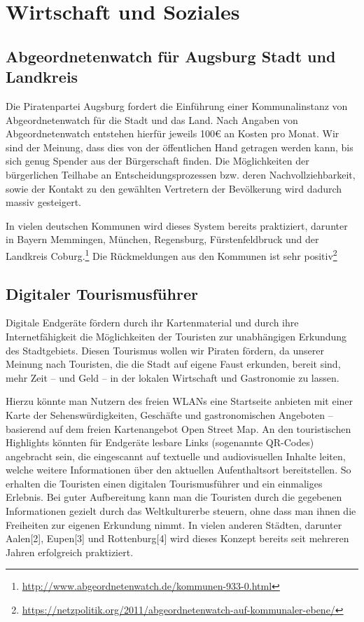 \chapter{Wirtschaft und Soziales}

  \section{Abgeordnetenwatch für Augsburg Stadt und Landkreis}
  
  Die Piratenpartei Augsburg fordert die Einführung einer Kommunalinstanz von 
  Abgeordnetenwatch für die Stadt und das Land. Nach Angaben von 
  Abgeordnetenwatch entstehen hierfür jeweils 100€ an Kosten pro Monat. Wir 
  sind der Meinung, dass dies von der öffentlichen Hand getragen werden kann, 
  bis sich genug Spender aus der Bürgerschaft finden. Die Möglichkeiten der 
  bürgerlichen Teilhabe an Entscheidungsprozessen bzw. deren 
  Nachvollziehbarkeit, sowie der Kontakt zu den gewählten Vertretern der 
  Bevölkerung wird dadurch massiv gesteigert. 
  
  In vielen deutschen Kommunen wird dieses System bereits praktiziert, 
  darunter in Bayern Memmingen, München, Regensburg, Fürstenfeldbruck und der 
  Landkreis 
  Coburg.\footnote{\url{http://www.abgeordnetenwatch.de/kommunen-933-0.html}} 
  Die Rückmeldungen aus den Kommunen ist sehr 
  positiv\footnote{\url{https://netzpolitik.org/2011/abgeordnetenwatch-auf-kommunaler-ebene/}}
  
  \section{Digitaler Tourismusführer}
  
  Digitale Endgeräte fördern durch ihr Kartenmaterial und durch ihre 
  Internetfähigkeit die Möglichkeiten der Touristen zur unabhängigen Erkundung 
  des Stadtgebiets. Diesen Tourismus wollen wir Piraten fördern, da unserer 
  Meinung nach Touristen, die die Stadt auf eigene Faust erkunden, bereit 
  sind, mehr Zeit – und Geld – in der lokalen Wirtschaft und Gastronomie zu 
  lassen.
  
  Hierzu könnte man Nutzern des freien WLANs eine Startseite anbieten mit 
  einer Karte der Sehenswürdigkeiten, Geschäfte und gastronomischen Angeboten 
  – basierend auf dem freien Kartenangebot Open Street Map. An den 
  touristischen Highlights könnten für Endgeräte lesbare Links (sogenannte 
  QR-Codes) angebracht sein, die eingescannt auf textuelle und audiovisuellen 
  Inhalte leiten, welche weitere Informationen über den aktuellen 
  Aufenthaltsort bereitstellen. So erhalten die Touristen einen digitalen 
  Tourismusführer und ein einmaliges Erlebnis. Bei guter Aufbereitung kann man 
  die Touristen durch die gegebenen Informationen gezielt durch das 
  Weltkulturerbe steuern, ohne dass man ihnen die Freiheiten zur eigenen 
  Erkundung nimmt. In vielen anderen Städten, darunter Aalen[2], Eupen[3] und 
  Rottenburg[4] wird dieses Konzept bereits seit mehreren Jahren erfolgreich 
  praktiziert.
  
